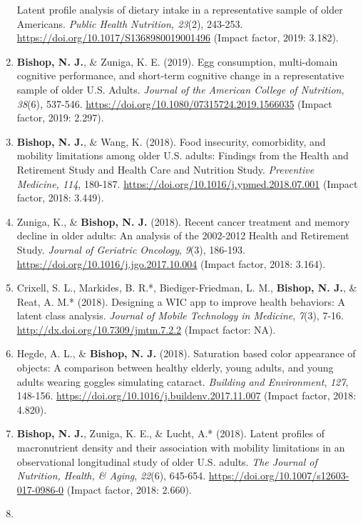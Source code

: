 \documentclass[
]{article}
\begin{document}
\begin{enumerate}
  Latent profile analysis of dietary intake in a representative sample
  of older Americans. \emph{Public Health Nutrition, 23}(2), 243-253.
  \url{https://doi.org/10.1017/S1368980019001496} (Impact factor, 2019:
  3.182).
\item
  \textbf{Bishop, N. J.}, \& Zuniga, K. E. (2019). Egg consumption,
  multi-domain cognitive performance, and short-term cognitive change in
  a representative sample of older U.S. Adults. \emph{Journal of the
  American College of Nutrition}, \emph{38}(6)\emph{,} 537-546.
  \url{https://doi.org/10.1080/07315724.2019.1566035} (Impact factor,
  2019: 2.297).
\item
  \textbf{Bishop, N. J.}, \& Wang, K. (2018). Food insecurity,
  comorbidity, and mobility limitations among older U.S. adults:
  Findings from the Health and Retirement Study and Health Care and
  Nutrition Study. \emph{Preventive Medicine, 114}, 180-187.
  \url{https://doi.org/10.1016/j.ypmed.2018.07.001} (Impact factor,
  2018: 3.449).
\item
  Zuniga, K., \& \textbf{Bishop, N. J.} (2018). Recent cancer treatment
  and memory decline in older adults: An analysis of the 2002-2012
  Health and Retirement Study. \emph{Journal of Geriatric Oncology},
  \emph{9}(3), 186-193. \url{https://doi.org/10.1016/j.jgo.2017.10.004}
  (Impact factor, 2018: 3.164).
\item
  Crixell, S. L., Markides, B. R.*, Biediger-Friedman, L. M.,
  \textbf{Bishop, N. J.}, \& Reat, A. M.* (2018). Designing a WIC app to
  improve health behaviors: A latent class analysis. \emph{Journal of
  Mobile Technology in Medicine}, \emph{7}(3), 7-16.
  \url{http://dx.doi.org/10.7309/jmtm.7.2.2} (Impact factor: NA).
\item
  Hegde, A. L., \& \textbf{Bishop, N. J.} (2018). Saturation based color
  appearance of objects: A comparison between healthy elderly, young
  adults, and young adults wearing goggles simulating cataract.
  \emph{Building and Environment}, \emph{127}, 148-156.
  \url{https://doi.org/10.1016/j.buildenv.2017.11.007} (Impact factor,
  2018: 4.820).
\item
  \textbf{Bishop, N. J.}, Zuniga, K. E., \& Lucht, A.* (2018). Latent
  profiles of macronutrient density and their association with mobility
  limitations in an observational longitudinal study of older U.S.
  adults. \emph{The Journal of Nutrition, Health, \& Aging},
  \emph{22}(6), 645-654. \url{https://doi.org/10.1007/s12603-017-0986-0}
  (Impact factor, 2018: 2.660).
\item

\end{enumerate}
\end{document}
